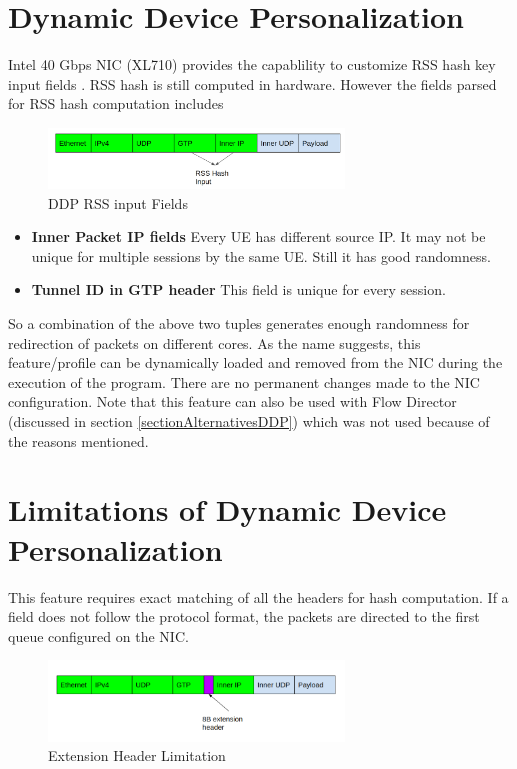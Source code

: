 \section{Dynamic Device Personalization \label{sectionDDP}}
Intel 40 Gbps NIC (XL710) provides the capablility to customize RSS hash key input fields \cite{ddpGuide}. RSS hash is still computed in hardware. However the fields parsed for RSS hash computation includes 
\begin{figure}[htbp]
    \centering
    \includegraphics[width=0.7\textwidth, keepaspectratio]{./fig/Ch3DDP/DDPpacketHashFields.png}
    \caption{DDP RSS input Fields}
    \label{figDDPRSSfields}
\end{figure}


\begin{itemize} 
\item \textbf{Inner Packet IP fields} Every UE has different source IP. It may not be unique for multiple sessions by the same UE. Still it has good randomness.
\item \textbf{Tunnel ID in GTP header} This field is unique for every session. 
\end{itemize}
So a combination of the above two tuples generates enough randomness for redirection of packets on different cores. 
As the name suggests, this feature/profile can be dynamically loaded and removed from the NIC during the execution of the program. There are no permanent changes made to the NIC configuration.
Note that this feature can also be used with Flow Director (discussed in section \ref{sectionAlternativesDDP}) which was not used because of the reasons mentioned.

\section{Limitations of Dynamic Device Personalization \label{sectionlimitationsDDP}}
This feature requires exact matching of all the headers for hash computation. If a field does not follow the protocol format, the packets are directed to the first queue configured on the NIC.

\begin{figure}[htbp]
    \centering
    \includegraphics[width=0.7\textwidth, keepaspectratio]{./fig/Ch3DDP/ExtensionHeaders.png}
    \caption{Extension Header Limitation}
    \label{figextensionheaderLimitation}
\end{figure}

